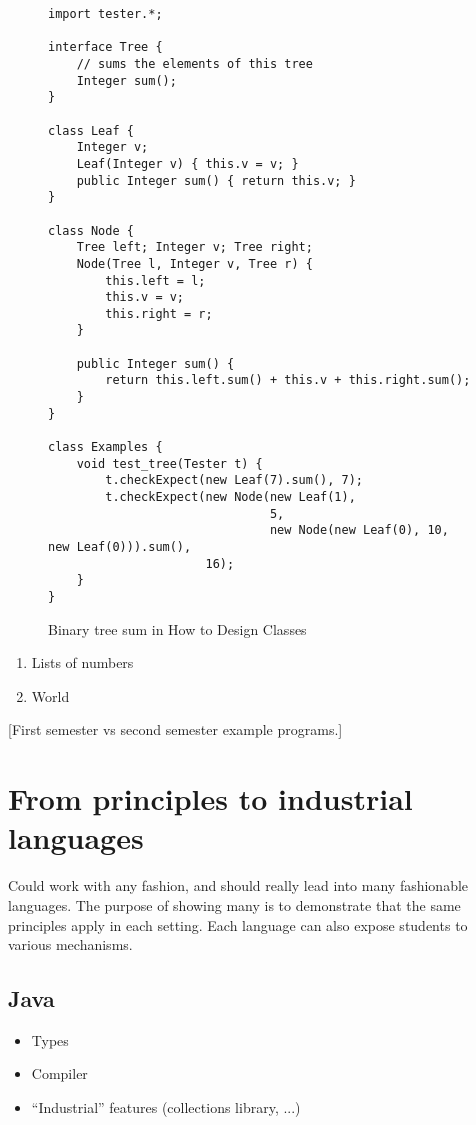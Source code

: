 \documentclass[submission,copyright]{eptcs}
\begin{document}
\begin{figure}
\begin{verbatim}
import tester.*;

interface Tree {
    // sums the elements of this tree
    Integer sum();
}

class Leaf {
    Integer v;
    Leaf(Integer v) { this.v = v; }
    public Integer sum() { return this.v; }
}

class Node {
    Tree left; Integer v; Tree right;
    Node(Tree l, Integer v, Tree r) {
        this.left = l;
        this.v = v;
        this.right = r;
    }

    public Integer sum() {
        return this.left.sum() + this.v + this.right.sum();
    }
}

class Examples {
    void test_tree(Tester t) {
        t.checkExpect(new Leaf(7).sum(), 7);
        t.checkExpect(new Node(new Leaf(1),
                               5, 
                               new Node(new Leaf(0), 10, new Leaf(0))).sum(),
                      16);
    }
}
\end{verbatim}
\caption{Binary tree sum in How to Design Classes}
\end{figure}

\begin{enumerate}
\item Lists of numbers
\item World
\end{enumerate}



[First semester vs second semester example programs.]

\section{From principles to industrial languages}
\label{sec:industrial}

Could work with any fashion, and should really lead into many
fashionable languages.  The purpose of showing many is to demonstrate
that the same principles apply in each setting.  Each language can also
expose students to various mechanisms.

\subsection{Java}

\begin{itemize}
\item Types
\item Compiler
\item ``Industrial'' features (collections library, ...)
\end{itemize}
\end{document}
